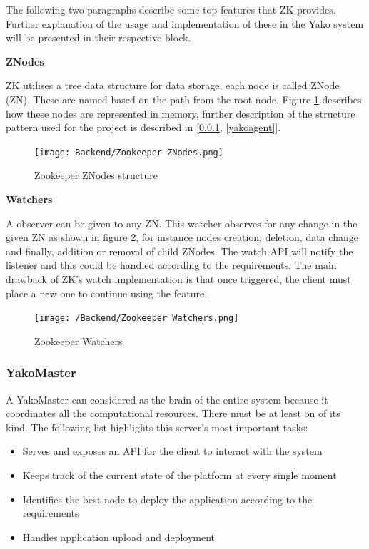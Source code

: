         The following two paragraphs describe some top features that ZK provides. Further explanation of the usage and implementation of these in the Yako system will be presented in their respective block.
        
        \textbf{ZNodes}
        
        ZK utilises a tree data structure for data storage, each node is called ZNode (ZN). These are named based on the path from the root node. Figure \ref{fig:zookeeper_znodes} describes how these nodes are represented in memory, further description of the structure pattern used for the project is described in [\ref{yakomaster}, \ref{yakoagent}].
        
        \begin{figure}[H]
            \centering
            \texttt{[image: Backend/Zookeeper ZNodes.png]}
            \caption{Zookeeper ZNodes structure}
            \label{fig:zookeeper_znodes}
        \end{figure}
        
        \textbf{Watchers}
        
        A observer can be given to any ZN. This watcher observes for any change in the given ZN as shown in figure \ref{fig:zookeeper_watchers}, for instance nodes creation, deletion, data change and finally, addition or removal of child ZNodes. The watch API will notify the listener and this could be handled according to the requirements. The main drawback of ZK's watch implementation is that once triggered, the client must place a new one to continue using the feature.
        
        \begin{figure}[H]
            \centering
            \texttt{[image: /Backend/Zookeeper Watchers.png]}
            \caption{Zookeeper Watchers}
            \label{fig:zookeeper_watchers}
        \end{figure}
    
    \subsubsection{YakoMaster} \label{yakomaster}
        A YakoMaster can considered as the brain of the entire system because it coordinates all the computational resources. There must be at least on of its kind. The following list highlights this server's most important tasks:
        
        \begin{itemize}
            \item Serves and exposes an API for the client to interact with the system
            \item Keeps track of the current state of the platform at every single moment
            \item Identifies the best node to deploy the application according to the requirements
            \item Handles application upload and deployment
        \end{itemize}
        
